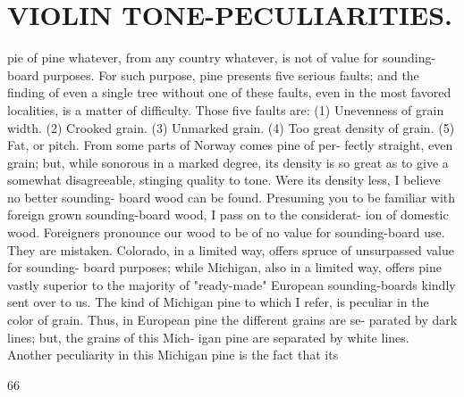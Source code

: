 \documentclass{article}
\begin{document}
\section*{VIOLIN TONE-PECULIARITIES.}
pie of pine whatever, from any country whatever, is not of value for sounding-board purposes. For such purpose, pine presents five serious faults; and the finding of even a single tree without one of these faults, even in the most favored localities, is a matter of difficulty. Those five faults are: (1) Unevenness of grain width. (2) Crooked grain. (3) Unmarked grain. (4) Too great density of grain. (5) Fat, or pitch. From some parts of Norway comes pine of per- fectly straight, even grain; but, while sonorous in a marked degree, its density is so great as to give a somewhat disagreeable, stinging quality to tone. Were its density less, I believe no better sounding- board wood can be found. Presuming you to be familiar with foreign grown sounding-board wood, I pass on to the considerat- ion of domestic wood. Foreigners pronounce our wood to be of no value for sounding-board use. They are mistaken. Colorado, in a limited way, offers spruce of unsurpassed value for sounding- board purposes; while Michigan, also in a limited way, offers pine vastly superior to the majority of "ready-made" European sounding-boards kindly sent over to us. The kind of Michigan pine to which I refer, is peculiar in the color of grain. Thus, in European pine the different grains are se- parated by dark lines; but, the grains of this Mich- igan pine are separated by white lines. Another peculiarity in this Michigan pine is the fact that its

66
\end{document}

